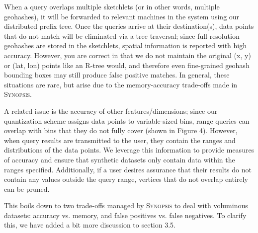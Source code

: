 \documentclass{article}
\begin{document}
\begin{tcolorbox}
    When a query overlaps multiple sketchlets (or in other words, multiple geohashes), it will be forwarded to relevant machines in the system using our distributed prefix tree. Once the queries arrive at their destination(s), data points that do not match will be eliminated via a tree traversal; since full-resolution geohashes are stored in the sketchlets, spatial information is reported with high accuracy. However, you are correct in that we do not maintain the original (x, y) or (lat, lon) points like an R-tree would, and therefore even fine-grained geohash bounding boxes may still produce false positive matches. In general, these situations are rare, but arise due to the memory-accuracy trade-offs made in \textsc{Synopsis}.

    A related issue is the accuracy of other features/dimensions; since our quantization scheme assigns data points to variable-sized bins, range queries can overlap with bins that they do not fully cover (shown in Figure 4). However, when query results are transmitted to the user, they contain the ranges and distributions of the data points. We leverage this information to provide measures of accuracy and ensure that synthetic datasets only contain data within the ranges specified. Additionally, if a user desires assurance that their results do not contain any values outside the query range, vertices that do not overlap entirely can be pruned.

    This boils down to two trade-offs managed by \textsc{Synopsis} to deal with voluminous datasets: accuracy vs. memory, and false positives vs. false negatives. To clarify this, we have added a bit more discussion to section 3.5.
\end{tcolorbox}
\end{document}
